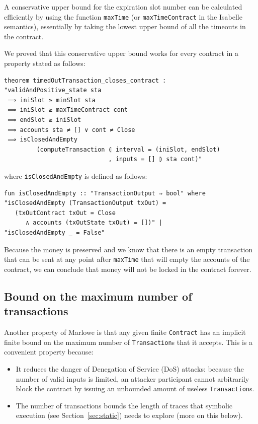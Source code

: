 \documentclass[runningheads]{llncs}
\begin{document}
A conservative upper bound for the expiration slot number can be calculated efficiently by using the function \texttt{maxTime} (or \texttt{maxTimeContract} in the Isabelle semantics), essentially by taking the lowest upper bound of all the timeouts in the contract.

We proved that this conservative upper bound works for every contract in a property stated as follows:

\begin{verbatim}
theorem timedOutTransaction_closes_contract :
"validAndPositive_state sta
 ⟹ iniSlot ≥ minSlot sta
 ⟹ iniSlot ≥ maxTimeContract cont
 ⟹ endSlot ≥ iniSlot
 ⟹ accounts sta ≠ [] ∨ cont ≠ Close
 ⟹ isClosedAndEmpty
         (computeTransaction ⦇ interval = (iniSlot, endSlot)
                             , inputs = [] ⦈ sta cont)"
\end{verbatim}

\noindent
where \texttt{isClosedAndEmpty} is defined as follows:

\begin{verbatim}
fun isClosedAndEmpty :: "TransactionOutput ⇒ bool" where
"isClosedAndEmpty (TransactionOutput txOut) =
   (txOutContract txOut = Close
      ∧ accounts (txOutState txOut) = [])" |
"isClosedAndEmpty _ = False"
\end{verbatim}
\noindent
Because the money is preserved and we know that there is an empty transaction that can be sent at any point after \texttt{maxTime} that will empty the accounts of the contract, we can conclude that money will not be locked in the contract forever.

\subsection{Bound on the maximum number of transactions\label{subsubsec:bound_max_transaction_number}}

Another property of Marlowe is that any given finite \texttt{Contract} has an implicit finite bound on the maximum number of \texttt{Transaction}s that it accepts. This is a convenient property because:

\begin{itemize}%
    \item It reduces the danger of Denegation of Service (DoS) attacks: because the number of valid inputs is limited, an attacker participant cannot arbitrarily block the contract by issuing an unbounded amount of useless \texttt{Transaction}s.
    \item The number of transactions bounds the length of traces that symbolic execution (see Section~\ref{sec:static}) needs to explore (more on this below).%
\end{itemize}
\end{document}
